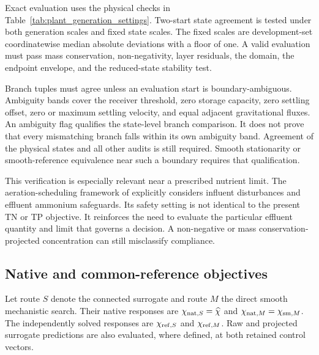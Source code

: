 Exact evaluation uses the physical checks in Table~\ref{tab:plant_generation_settings}. Two-start state agreement is tested under both generation scales and fixed state scales. The fixed scales are development-set coordinatewise median absolute deviations with a floor of one. A valid evaluation must pass mass conservation, non-negativity, layer residuals, the domain, the endpoint envelope, and the reduced-state stability test.

Branch tuples must agree unless an evaluation start is boundary-ambiguous. Ambiguity bands cover the receiver threshold, zero storage capacity, zero settling offset, zero or maximum settling velocity, and equal adjacent gravitational fluxes. An ambiguity flag qualifies the state-level branch comparison. It does not prove that every mismatching branch falls within its own ambiguity band. Agreement of the physical states and all other audits is still required. Smooth stationarity or smooth-reference equivalence near such a boundary requires that qualification.

This verification is especially relevant near a prescribed nutrient limit. The aeration-scheduling framework of \citet{Ren2026} explicitly considers influent disturbances and effluent ammonium safeguards. Its safety setting is not identical to the present TN or TP objective. It reinforces the need to evaluate the particular effluent quantity and limit that governs a decision. A non-negative or mass conservation-projected concentration can still misclassify compliance.

\subsection{Native and common-reference objectives}

Let route $S$ denote the connected surrogate and route $M$ the direct smooth mechanistic search. Their native responses are $\chi_{{\rm nat},S}=\widehat\chi$ and $\chi_{{\rm nat},M}=\chi_{{\rm sm},M}$. The independently solved responses are $\chi_{{\rm ref},S}$ and $\chi_{{\rm ref},M}$. Raw and projected surrogate predictions are also evaluated, where defined, at both retained control vectors.

